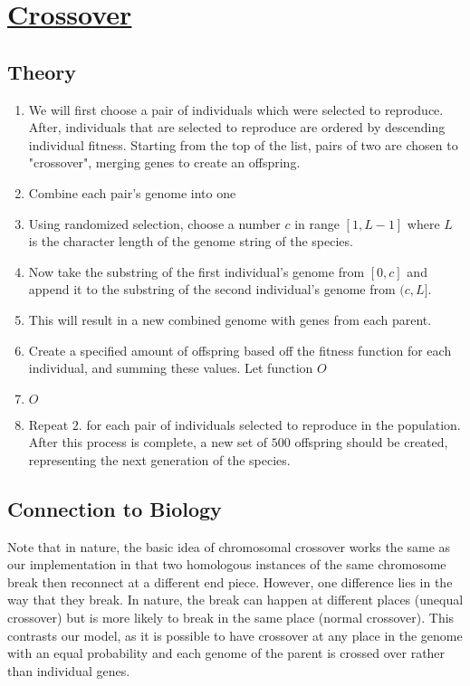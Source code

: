 \newpage
\section{\underline{Crossover}}

\subsection{Theory}
\begin{enumerate}
\item We will first choose a pair of individuals which were selected to reproduce. After, individuals that are selected to reproduce are ordered by descending individual fitness. Starting from the top of the list, pairs of two are chosen to "crossover", merging genes to create an offspring. 
\item Combine each pair's genome into one
\bi
\item Using randomized selection, choose a number $c$ in range $[1,L-1]$ where $L$ is the character length of the genome string of the species.
\item Now take the substring of the first individual's genome from $[0, c]$ and append it to the substring of the second individual's genome from $(c, L]$. 
\item This will result in a new combined genome with genes from each parent.
\item Create a specified amount of offspring based off the fitness function for each individual, and summing these values. Let function $O$
\item $O$
\ei
\item Repeat $2.$ for each pair of individuals selected to reproduce in the population. After this process is complete, a new set of $500$ offspring should be created, representing the next generation of the species. 
\end{enumerate}

\subsection{Connection to Biology}
Note that in nature, the basic idea of chromosomal crossover works 
the same as our implementation in that two homologous instances of the same
chromosome break then reconnect at a different end piece. However, one 
difference lies in the way that they break. In nature, the break can happen
at different places (unequal crossover) but is more likely to break in the
same place (normal crossover). This contrasts our model, as it is possible
to have crossover at any place in the genome with an equal probability
and each genome of the parent is crossed over rather than individual genes.